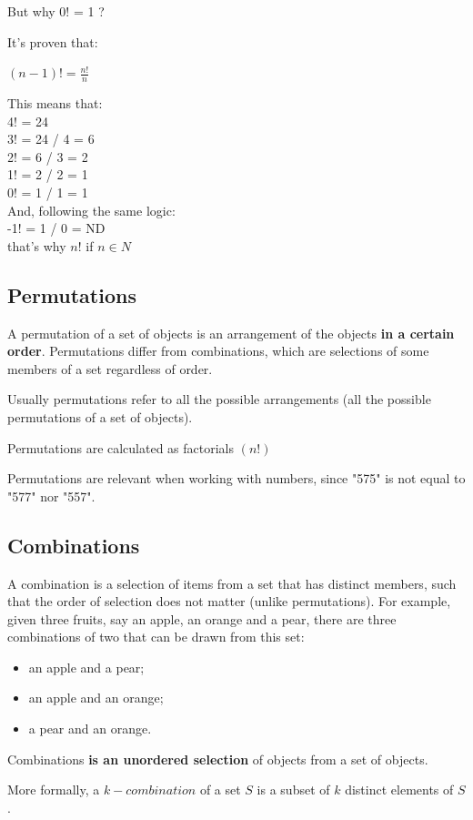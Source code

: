 \documentclass{article}
\begin{document}
But why 0! = 1 ?

It’s proven that:

$(n-1)! = \frac{n!}{n}$

This means that: \\
4! = 24 \\
3! = 24 / 4 = 6 \\
2! = 6 / 3 = 2 \\
1! = 2 / 2 = 1 \\
0! = 1 / 1 = 1 \\

And, following the same logic: \\
-1! = 1 / 0 = ND \\

that’s why $n!$ if $n \in {N} $ 

\subsection{Permutations}
A permutation of a set of objects is an arrangement of the objects \textbf{in a certain order}. 
Permutations differ from combinations, which are selections of some members of a set regardless of order. 

Usually permutations refer to all the possible arrangements (all the possible permutations of a set of objects). 

Permutations are calculated as factorials $(n!)$

Permutations are relevant when working with numbers, since "575" is not equal to "577" nor "557".

\subsection{Combinations}
A combination is a selection of items from a set that has distinct members, such that the order of selection does not matter (unlike permutations). 
For example, given three fruits, say an apple, an orange and a pear, there are three combinations of two that can be drawn from this set: 
\begin{itemize}
    \item an apple and a pear;
    \item an apple and an orange;
    \item a pear and an orange.
\end{itemize} 
Combinations \textbf{is an unordered selection} of objects from a set of objects.

More formally, a $k-combination$ of a set $S$ is a subset of $k$ distinct elements of $S$.
\end{document}
